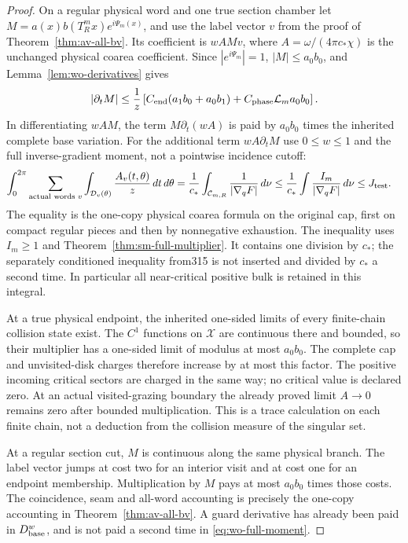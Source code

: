 \begin{proof}
On a regular physical word and one true section chamber let
$M=a(x)b(T_R^mx)e^{i\Psi_m(x)}$, and use the label vector $v$
from the proof of Theorem~\ref{thm:av-all-bv}.  Its coefficient is
$wAMv$, where $A=\omega/(4\pi c_*\chi)$ is the unchanged
physical coarea coefficient.  Since $|e^{i\Psi_m}|=1$,
$|M|\le a_0b_0$, and Lemma~\ref{lem:wo-derivatives} gives
\begin{equation}\label{eq:wo-product-derivative}
 |\partial_t M|\le\frac1z
 \left[C_{\rm end}(a_1b_0+a_0b_1)
                 +C_{\rm phase}\mathcal L_m a_0b_0\right].
\end{equation}
In differentiating $wAM$, the term $M\partial_t(wA)$ is paid
by $a_0b_0$ times the inherited complete base variation.  For
the additional term $wA\partial_tM$ use $0\le w\le1$ and
the full inverse-gradient moment, not a pointwise incidence cutoff:
\begin{align}
 \int_0^{2\pi}\sum_{\text{actual words }v}
       \int_{\mathcal D_v(\theta)}\frac{A_v(t,\theta)}{z}\,dt\,d\theta
 &=\frac1{c_*}\int_{\mathcal C_{m,R}}\frac1{|\nabla_qF|}\,d\nu
 \le\frac1{c_*}\int\frac{I_m}{|\nabla_qF|}\,d\nu
 \le J_{\rm test}.                                  \label{eq:wo-full-moment}
\end{align}
The equality is the one-copy physical coarea formula on the
original cap, first on compact regular pieces and then by
nonnegative exhaustion.  The inequality uses $I_m\ge1$ and
Theorem~\ref{thm:sm-full-multiplier}.  It contains one division
by $c_*$; the separately conditioned inequality from315 is not
inserted and divided by $c_*$ a second time.  In particular all
near-critical positive bulk is retained in this integral.

At a true physical endpoint, the inherited one-sided limits of
every finite-chain collision state exist.  The $C^1$ functions
on $\mathcal X$ are continuous there and bounded, so their
multiplier has a one-sided limit of modulus at most $a_0b_0$.
The complete cap and unvisited-disk charges therefore increase
by at most this factor.  The positive incoming critical sectors
are charged in the same way; no critical value is declared zero.
At an actual visited-grazing boundary the already proved limit
$A\longrightarrow0$ remains zero after bounded multiplication.
This is a trace calculation on each finite chain, not a
deduction from the collision measure of the singular set.

At a regular section cut, $M$ is continuous along the same
physical branch.  The label vector jumps at cost two for an
interior visit and at cost one for an endpoint membership.
Multiplication by $M$ pays at most $a_0b_0$ times those costs.
The coincidence, seam and all-word accounting is precisely the
one-copy accounting in Theorem~\ref{thm:av-all-bv}.  A guard
derivative has already been paid in $D_{\rm base}^w$, and is
not paid a second time in \eqref{eq:wo-full-moment}.


\end{proof}
